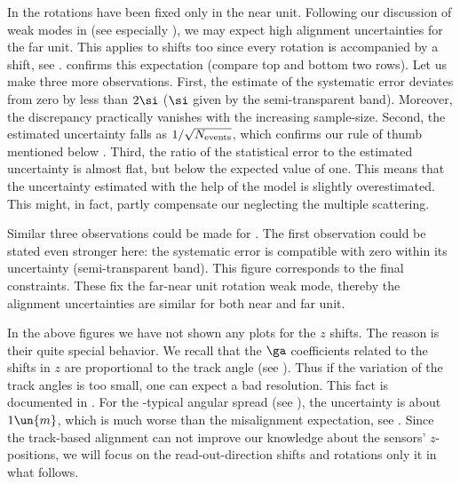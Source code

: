 \eject
In  the rotations have been fixed only in the near unit. Following our discussion of weak modes in  (see especially ), we may expect high alignment uncertainties for the far unit. This applies to shifts too since every rotation is accompanied by a shift, see .  confirms this expectation (compare top and bottom two rows). Let us make three more observations. First, the estimate of the systematic error deviates from zero by less than $2\si$ ($\si$ given by the semi-transparent band). Moreover, the discrepancy practically vanishes with the increasing sample-size. Second, the estimated uncertainty falls as $1/\sqrt{N_{\rm events}}$, which confirms our rule of thumb mentioned below . Third, the ratio of the statistical error to the estimated uncertainty is almost flat, but below the expected value of one. This means that the uncertainty estimated with the help of the model  is slightly overestimated. This might, in fact, partly compensate our neglecting the multiple scattering.

Similar three observations could be made for . The first observation could be stated even stronger here: the systematic error is compatible with zero within its uncertainty (semi-transparent band). This figure corresponds to the final constraints. These fix the far-near unit rotation weak mode, thereby the alignment uncertainties are similar for both near and far unit.


In the above figures we have not shown any plots for the $z$ shifts. The reason is their quite special behavior. We recall that the $\ga$ coefficients related to the shifts in $z$ are proportional to the track angle (see ). Thus if the variation of the track angles is too small, one can expect a bad resolution. This fact is documented in . For the -typical angular spread (see ), the uncertainty is about $1\un{m}$, which is much worse than the misalignment expectation, see . Since the track-based alignment can not improve our knowledge about the sensors' $z$-positions, we will focus on the read-out-direction shifts and rotations only it in what follows.

